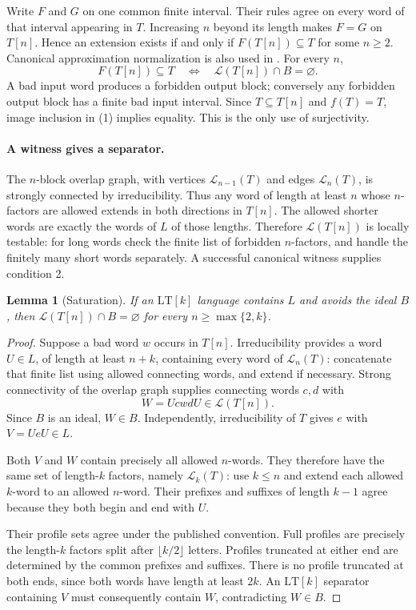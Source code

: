 \documentclass[11pt]{article}
\newtheorem{lemma}{Lemma}
\newcommand{\Lang}{\mathcal L}
\newcommand{\LT}{\mathrm{LT}}
\begin{document}
Write $F$ and $G$ on one common finite interval. Their rules agree on
every word of that interval appearing in $T$. Increasing $n$ beyond
its length makes $F=G$ on $T[n]$. Hence an extension exists if and only
if $F(T[n])\subseteq T$ for some $n\ge2$. Canonical approximation
normalization is also used in \cite[Lemma 2.1]{Ballier}.
For every $n$,
\[
 F(T[n])\subseteq T
       \quad\Longleftrightarrow\quad \Lang(T[n])\cap B=\varnothing.
 \tag{1}
\]
A bad input word produces a forbidden output block; conversely any
forbidden output block has a finite bad input interval. Since
$T\subseteq T[n]$ and $f(T)=T$, image inclusion in (1) implies equality.
This is the only use of surjectivity.

\paragraph{A witness gives a separator.}
The $n$-block overlap graph, with vertices $\Lang_{n-1}(T)$ and edges
$\Lang_n(T)$, is strongly connected by irreducibility. Thus any word
of length at least $n$ whose $n$-factors are allowed extends in both
directions in $T[n]$. The allowed shorter words are exactly the words
of $L$ of those lengths. Therefore $\Lang(T[n])$ is locally testable:
for long words check the finite list of forbidden $n$-factors, and
handle the finitely many short words separately. A successful canonical
witness supplies condition 2.

\begin{lemma}[Saturation]\label{sat}
If an $\LT[k]$ language contains $L$ and avoids the ideal $B$, then
$\Lang(T[n])\cap B=\varnothing$ for every $n\ge\max\{2,k\}$.
\end{lemma}
\begin{proof}
Suppose a bad word $w$ occurs in $T[n]$. Irreducibility provides a word
$U\in L$, of length at least $n+k$, containing every word of
$\Lang_n(T)$: concatenate that finite list using allowed connecting
words, and extend if necessary. Strong connectivity of the overlap
graph supplies connecting words $c,d$ with
\[
 W=UcwdU\in\Lang(T[n]).
\]
Since $B$ is an ideal, $W\in B$. Independently, irreducibility of $T$
gives $e$ with $V=UeU\in L$.

Both $V$ and $W$ contain precisely all allowed $n$-words. They therefore
have the same set of length-$k$ factors, namely $\Lang_k(T)$: use
$k\le n$ and extend each allowed $k$-word to an allowed $n$-word.
Their prefixes and suffixes of length $k-1$ agree because they both
begin and end with $U$.

Their profile sets agree under the published convention. Full
profiles are precisely the length-$k$ factors split after
$\lfloor k/2\rfloor$ letters. Profiles truncated at either end are
determined by the common prefixes and suffixes. There is no profile
truncated at both ends, since both words have length at least $2k$.
An $\LT[k]$ separator containing $V$ must consequently contain $W$,
contradicting $W\in B$.
\end{proof}
\end{document}
